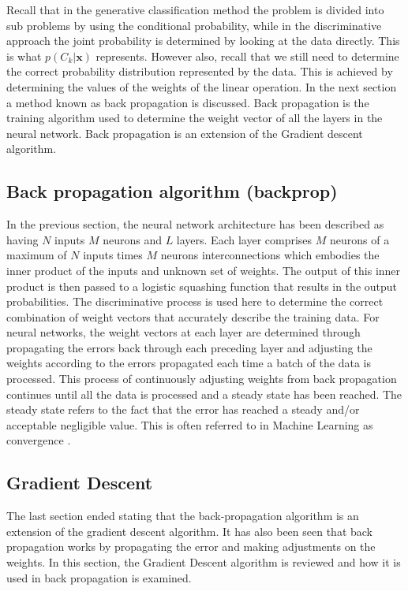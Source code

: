 Recall that in the generative classification method the problem is divided into sub problems by using the conditional probability, while in the discriminative approach the joint probability is determined by looking at the data directly.  This is what $p(C_k|\mathbf{x})$ represents.  However also, recall that we still need to determine the correct probability distribution represented by the data.  This is achieved by determining the values of the weights of the linear operation.  In the next section a method known as back propagation is discussed.  Back propagation is the training algorithm used to determine the weight vector of all the layers in the neural network.  Back propagation is an extension of the Gradient descent algorithm.

\subsection{Back propagation algorithm (backprop)}
In the previous section, the neural network architecture has been described as having $N$ inputs $M$ neurons and $L$ layers. Each layer comprises $M$ neurons of a maximum of $N$ inputs times $M$ neurons interconnections which embodies the inner product of the inputs and unknown set of weights. The output of this inner product is then passed to a logistic squashing function that results in the output probabilities.  The discriminative process is used here to determine the correct combination of weight vectors that accurately describe the training data.  For neural networks, the weight vectors at each layer are determined through propagating the errors back through each preceding layer and adjusting the weights according to the errors propagated each time a batch of the data is processed.  This process of continuously adjusting weights from back propagation continues until all the data is processed and a steady state has been reached.  The steady state refers to the fact that the error has reached a steady and/or acceptable negligible value.  This is often referred to in Machine Learning as convergence \citep{boden2002guide}.

\subsection{Gradient Descent}
The last section ended stating that the back-propagation algorithm is an extension of the gradient descent algorithm.  It has also been seen that back propagation works by propagating the error and making adjustments on the weights.  In this section, the Gradient Descent algorithm is reviewed and how it is used in back propagation is examined.  


